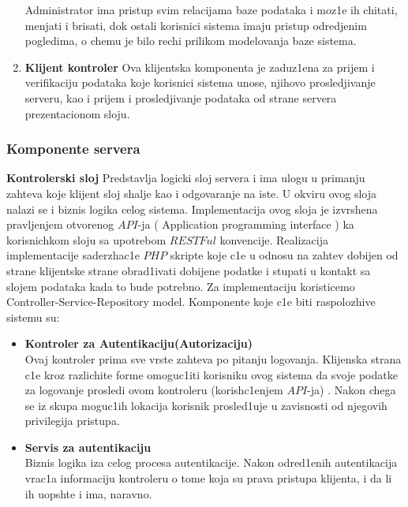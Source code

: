 \begin{enumerate}
\begin{itemize}
\end{itemize}

Administrator ima pristup svim relacijama baze podataka i moz1e ih chitati, menjati i brisati, dok ostali korisnici sistema imaju pristup odredjenim pogledima, o chemu je bilo rechi prilikom modelovanja baze sistema.
 \item \textbf{Klijent kontroler}
 Ova klijentska komponenta je zaduz1ena za prijem i verifikaciju podataka koje korisnici sistema unose, njihovo prosledjivanje serveru, kao i prijem i prosledjivanje podataka od strane servera prezentacionom sloju. 
\end{enumerate}
\subsubsection{Komponente servera}
\begin{enumarate}
	\item {\textbf{Kontrolerski sloj}
			Predstavlja logicki sloj servera i ima ulogu u primanju zahteva koje klijent sloj shalje kao i odgovaranje na iste. U okviru ovog sloja nalazi se i biznis logika celog sistema.  Implementacija ovog sloja je izvrshena pravljenjem otvorenog $API$-ja ( \selectfont Application programming interface  \selectfont ) ka korisnichkom sloju sa upotrebom $RESTFul$ konvencije. Realizacija implementacije saderzhac1e $PHP$ skripte koje c1e u odnosu na zahtev dobijen od strane klijentske strane obrad1ivati dobijene podatke i stupati u kontakt sa slojem podataka kada to bude potrebno. Za implementaciju koristicemo  \selectfont Controller-Service-Repository \selectfont  model.  Komponente koje c1e biti raspolozhive sistemu su:
			\begin{itemize}
				\item {\textbf{Kontroler za Autentikaciju(Autorizaciju)} \\
						Ovaj kontroler prima sve vrste zahteva po pitanju logovanja. Klijenska strana c1e kroz razlichite forme omoguc1iti korisniku ovog sistema da svoje podatke za logovanje prosledi ovom kontroleru (korish\-c1enjem $API$-ja) . Nakon chega se iz skupa moguc1ih lokacija korisnik prosled1uje u zavisnosti od njegovih privilegija pristupa.}
				\item{\textbf{Servis za autentikaciju}\\
				Biznis logika iza celog procesa autentikacije. Nakon odred1enih autentikacija vrac1a informaciju kontroleru o tome koja su prava pristupa klijenta, i da li ih uopshte i ima, naravno.}

\end{itemize}}
\end{enumarate}
